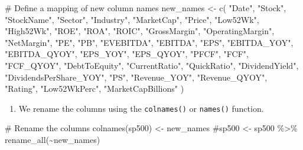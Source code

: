 \documentclass[
  letterpaper,
  DIV=11,
  numbers=noendperiod]{scrreport}
\newenvironment{Shaded}{\begin{snugshade}}{\end{snugshade}}
\newcommand{\CommentTok}[1]{\textcolor[rgb]{0.37,0.37,0.37}{#1}}
\newcommand{\FunctionTok}[1]{\textcolor[rgb]{0.28,0.35,0.67}{#1}}
\newcommand{\NormalTok}[1]{\textcolor[rgb]{0.00,0.23,0.31}{#1}}
\newcommand{\OtherTok}[1]{\textcolor[rgb]{0.00,0.23,0.31}{#1}}
\newcommand{\StringTok}[1]{\textcolor[rgb]{0.13,0.47,0.30}{#1}}
\providecommand{\tightlist}{%
  \setlength{\itemsep}{0pt}\setlength{\parskip}{0pt}}\usepackage{longtable,booktabs,array}
\begin{document}
\begin{Shaded}
\begin{Highlighting}[]
\CommentTok{\# Define a mapping of new column names}
\NormalTok{new\_names }\OtherTok{\textless{}{-}} \FunctionTok{c}\NormalTok{(}
  \StringTok{"Date"}\NormalTok{, }\StringTok{"Stock"}\NormalTok{, }\StringTok{"StockName"}\NormalTok{, }\StringTok{"Sector"}\NormalTok{, }\StringTok{"Industry"}\NormalTok{, }
  \StringTok{"MarketCap"}\NormalTok{, }\StringTok{"Price"}\NormalTok{, }\StringTok{"Low52Wk"}\NormalTok{, }\StringTok{"High52Wk"}\NormalTok{, }
  \StringTok{"ROE"}\NormalTok{, }\StringTok{"ROA"}\NormalTok{, }\StringTok{"ROIC"}\NormalTok{, }\StringTok{"GrossMargin"}\NormalTok{, }
  \StringTok{"OperatingMargin"}\NormalTok{, }\StringTok{"NetMargin"}\NormalTok{, }\StringTok{"PE"}\NormalTok{, }
  \StringTok{"PB"}\NormalTok{, }\StringTok{"EVEBITDA"}\NormalTok{, }\StringTok{"EBITDA"}\NormalTok{, }\StringTok{"EPS"}\NormalTok{, }
  \StringTok{"EBITDA\_YOY"}\NormalTok{, }\StringTok{"EBITDA\_QYOY"}\NormalTok{, }\StringTok{"EPS\_YOY"}\NormalTok{, }
  \StringTok{"EPS\_QYOY"}\NormalTok{, }\StringTok{"PFCF"}\NormalTok{, }\StringTok{"FCF"}\NormalTok{, }
  \StringTok{"FCF\_QYOY"}\NormalTok{, }\StringTok{"DebtToEquity"}\NormalTok{, }\StringTok{"CurrentRatio"}\NormalTok{, }
  \StringTok{"QuickRatio"}\NormalTok{, }\StringTok{"DividendYield"}\NormalTok{, }
  \StringTok{"DividendsPerShare\_YOY"}\NormalTok{, }\StringTok{"PS"}\NormalTok{, }
  \StringTok{"Revenue\_YOY"}\NormalTok{, }\StringTok{"Revenue\_QYOY"}\NormalTok{, }\StringTok{"Rating"}\NormalTok{,}
  \StringTok{"Low52WkPerc"}\NormalTok{, }\StringTok{"MarketCapBillions"}
\NormalTok{)}
\end{Highlighting}
\end{Shaded}

\begin{enumerate}
\def\labelenumi{\arabic{enumi}.}
\setcounter{enumi}{2}
\tightlist
\item
  We rename the columns using the \texttt{colnames()} or
  \texttt{names()} function.
\end{enumerate}

\begin{Shaded}
\begin{Highlighting}[]
\CommentTok{\# Rename the columns }
\FunctionTok{colnames}\NormalTok{(sp500) }\OtherTok{\textless{}{-}}\NormalTok{ new\_names}
\CommentTok{\#sp500 \textless{}{-} sp500 \%\textgreater{}\% rename\_all(\textasciitilde{}new\_names)}
\end{Highlighting}
\end{Shaded}
\end{document}
